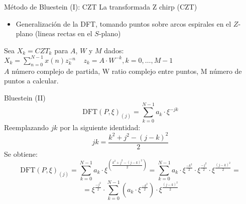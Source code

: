 \documentclass[spanish]{beamer}
\newcommand{\DFT}{\text{DFT}}
\begin{document}
\begin{frame}{Método de Bluestein (I): CZT}
La transformada Z chirp (CZT) 
\begin{itemize}
    \item Generalización de la DFT, tomando puntos sobre arcos espirales en el $Z$-plano (lineas rectas en el $S$-plano)
\end{itemize}
    \begin{definition}
    Sea $X_k = CZT_k$ para $A$, $W$ y $M$ dados:\\
    $X_k = \sum\limits_{n=0}^{N-1} x(n) z^{-n}_{k}\ \ \ \ \ z_k=A \cdot W^{-k}, k = 0,\dots, M-1$\\
    $A$ número complejo de partida, W ratio complejo entre puntos, M número de puntos a calcular.
    \end{definition}
\end{frame}

\begin{frame}{Bluestein (II)}
\begin{equation*}
\DFT(P,\xi)_{(j)}=\sum\limits_{k=0}^{N-1} a_k \cdot\xi^{-jk}
\end{equation*}
Reemplazando $jk$ por la siguiente identidad:
\begin{equation*}
    jk = \frac{k^2+j^2-(j-k)^2}{2}
\end{equation*}
Se obtiene:
\begin{equation*}
    \DFT(P,\xi)_{(j)}=\sum\limits_{k=0}^{N-1} a_k \cdot\xi^{( \frac{k^2+j^2-(j-k)^2}{2})} = \sum\limits_{k=0}^{N-1} a_k \cdot\xi^{\frac{-k^2}{2}} \cdot\xi ^ {\frac{-j^2}{2}} \cdot\xi ^{\frac{(j-k)^2}{2}} =
\end{equation*}
\begin{equation*}
     = \boxed{\xi ^{\frac{-j^2}{2}} \cdot \sum\limits_{k=0}^{N-1} (a_k \cdot\xi ^ {\frac{-k^2}{2}}) \cdot \xi^{ \frac{(j-k)^2}{2}} }
\end{equation*}
\end{frame}
\end{document}
